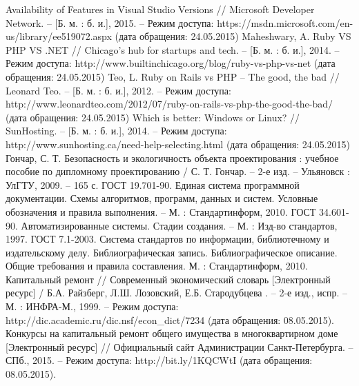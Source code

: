 \renewcommand{\refname}{Список использованных источников}

\begin{thebibliography}{99}

	 Availability of Features in Visual Studio Versions // Microsoft Developer Network. – [Б. м. : б. и.], 2015. – Режим доступа: https://msdn.microsoft.com/en-us/library/ee519072.aspx (дата обращения: 24.05.2015)
	 Maheshwary, A. Ruby VS PHP VS .NET // Chicago's hub for startups and tech. – [Б. м. : б. и.], 2014. – Режим доступа: http://www.builtinchicago.org/blog/ruby-vs-php-vs-net (дата обращения: 24.05.2015)
	 Teo, L. Ruby on Rails vs PHP – The good, the bad // Leonard Teo. – [Б. м. : б. и.], 2012. – Режим доступа: http://www.leonardteo.com/2012/07/ruby-on-rails-vs-php-the-good-the-bad/ (дата обращения: 24.05.2015)
	 Which is better: Windows or Linux? // SunHosting. – [Б. м. : б. и.], 2014. – Режим доступа: http://www.sunhosting.ca/need-help-selecting.html (дата обращения: 24.05.2015)
	 Гончар, С. Т. Безопасность и экологичность объекта проектирования : учебное пособие по дипломному проектированию / С. Т. Гончар. – 2-е изд. – Ульяновск : УлГТУ, 2009. – 165 с.
	 ГОСТ 19.701-90. Единая система программной документации. Схемы алгоритмов, программ, данных и систем. Условные обозначения и правила выполнения. – М. : Стандартинформ, 2010.
	 ГОСТ 34.601-90. Автоматизированные системы. Стадии создания. – М. : Изд-во стандартов, 1997.
	 ГОСТ 7.1-2003. Система стандартов по информации, библиотечному и издательскому делу. Библиографическая запись. Библиографическое описание. Общие требования и правила составления.  М. : Стандартинформ, 2010.
	 Капитальный ремонт // Современный экономический словарь [Электронный ресурс] / Б.А. Райзберг, Л.Ш. Лозовский, Е.Б. Стародубцева . – 2-е изд., испр. – М. : ИНФРА-М., 1999. – Режим доступа: http://dic.academic.ru/dic.nsf/econ\_dict/7234 (дата обращения: 08.05.2015).
	 Конкурсы на капитальный ремонт общего имущества в многоквартирном доме [Электронный ресурс] // Официальный сайт Администрации Санкт-Петербурга. – СПб., 2015. – Режим доступа: http://bit.ly/1KQCWtI (дата обращения: 08.05.2015).

\end{thebibliography}
